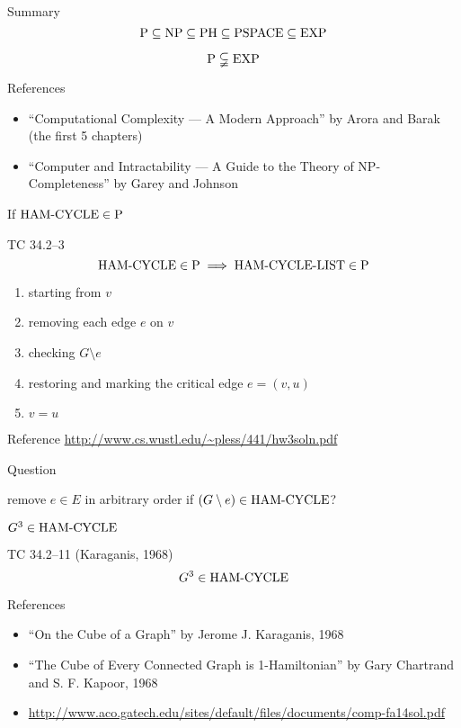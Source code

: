 \begin{frame}{Summary}
  \[
	\text{P} \subseteq \text{NP} \subseteq \text{PH} \subseteq \text{PSPACE} \subseteq \text{EXP}
  \]

  \[
	\text{P} \subsetneqq \text{EXP}
  \]

  \begin{alertblock}{References}
	\begin{itemize}
	  \item ``Computational Complexity --- A Modern Approach'' by Arora and Barak {\footnotesize (the first 5 chapters)}
	  \item ``Computer and Intractability --- A Guide to the Theory of NP-Completeness'' by Garey and Johnson
	\end{itemize}
  \end{alertblock}
\end{frame}  
\begin{frame}{If $\text{HAM-CYCLE} \in \text{P}$}
  \begin{exampleblock}{TC 34.2--3}
    \[
	  \text{HAM-CYCLE} \in \text{P} \implies \text{HAM-CYCLE}\text{-LIST} \in \text{P}
	\]
  \end{exampleblock}

  \begin{enumerate}
	\item starting from $v$
	\item removing each edge $e$ on $v$
	\item checking $G \setminus e$
	\item restoring and marking the critical edge $e = (v, u)$
	\item $v = u$
  \end{enumerate}

  \begin{alertblock}{Reference}
	\url{http://www.cs.wustl.edu/~pless/441/hw3soln.pdf}
  \end{alertblock}

  \begin{alertblock}{Question}
	\centerline{remove $e \in E$ in arbitrary order if $(G \setminus e) \in \text{HAM-CYCLE}$?}
  \end{alertblock}
\end{frame}
\begin{frame}{$G^3 \in \text{HAM-CYCLE}$}
  \begin{exampleblock}{TC 34.2--11 (Karaganis, 1968)}
	\[
	  G^3 \in \text{HAM-CYCLE}
	\]
  \end{exampleblock}

  \begin{alertblock}{References}
	\begin{itemize}
	  \item ``On the Cube of a Graph'' by Jerome J. Karaganis, 1968
	  \item ``The Cube of Every Connected Graph is 1-Hamiltonian'' by Gary Chartrand and S. F. Kapoor, 1968
	  \item \url{http://www.aco.gatech.edu/sites/default/files/documents/comp-fa14sol.pdf}
	  \end{itemize}
  \end{alertblock}
\end{frame}

